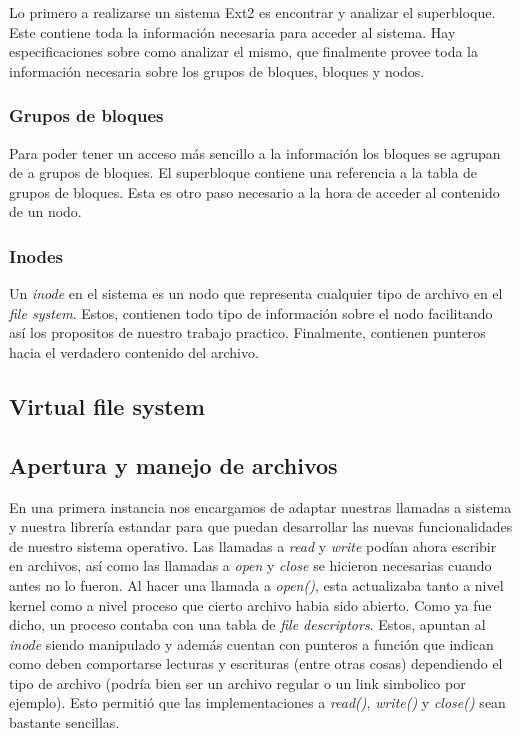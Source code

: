 \documentclass[a4paper,10pt]{article}
\begin{document}
        Lo primero a realizarse un sistema Ext2 es encontrar y analizar el superbloque. Este contiene toda la información
        necesaria para acceder al sistema. Hay especificaciones sobre como analizar el mismo, que finalmente provee
        toda la información necesaria sobre los grupos de bloques, bloques y nodos.

        \subsubsection{Grupos de bloques}
        
        Para poder tener un acceso más sencillo a la información los bloques se agrupan de a grupos de bloques.
        El superbloque contiene una referencia a la tabla de grupos de bloques. Esta es otro paso necesario a la hora
        de acceder al contenido de un nodo.

        \subsubsection{Inodes}
    
        Un \textit{inode} en el sistema es un nodo que representa cualquier tipo de archivo en el \textit{file system}.
        Estos, contienen todo tipo de información sobre el nodo facilitando así los propositos de nuestro trabajo
        practico. Finalmente, contienen punteros hacia el verdadero contenido del archivo.

        \subsection{Virtual file system}
    
    \subsection{Apertura y manejo de archivos}
    En una primera instancia nos encargamos de adaptar nuestras llamadas a sistema y nuestra librería estandar
    para que puedan desarrollar las nuevas funcionalidades de nuestro sistema operativo. Las llamadas a \textit{read} y
    \textit{write} podían ahora escribir en archivos, así como las llamadas a \textit{open} y \textit{close} se hicieron
    necesarias cuando antes no lo fueron.
    Al hacer una llamada a \textit{open()}, esta actualizaba tanto a nivel kernel como a nivel proceso que cierto
    archivo habia sido abierto. Como ya fue dicho, un proceso contaba con una tabla de \textit{file descriptors}. 
    Estos, apuntan al \textit{inode} siendo manipulado y además cuentan con punteros a función que indican como 
    deben comportarse lecturas y escrituras (entre otras cosas) dependiendo el tipo de archivo 
    (podría bien ser un archivo regular o un link simbolico por ejemplo). Esto permitió que las implementaciones 
    a \textit{read()}, \textit{write()} y \textit{close()} sean bastante sencillas. 
    
\end{document}
